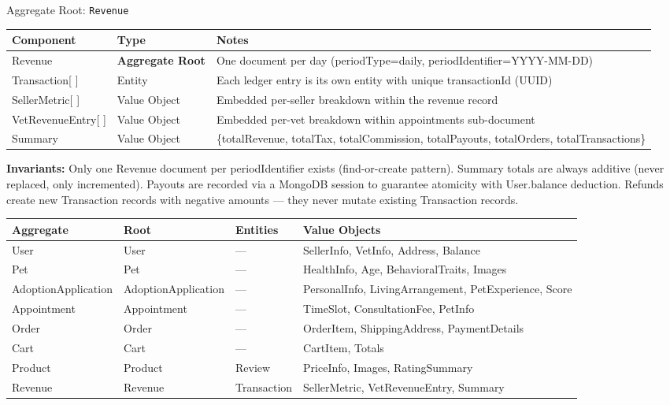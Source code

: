 \documentclass[12pt,a4paper]{article}
\begin{document}
\begin{infobox}{Aggregate Root: \texttt{Revenue}}
\begin{tabular}{@{}p{3cm}p{2.8cm}p{7.8cm}@{}}
\textbf{Component} & \textbf{Type} & \textbf{Notes} \\
\hline
Revenue & \textbf{Aggregate Root} & One document per day (periodType=daily, periodIdentifier=YYYY-MM-DD) \\
Transaction[ ] & Entity & Each ledger entry is its own entity with unique transactionId (UUID) \\
SellerMetric[ ] & Value Object & Embedded per-seller breakdown within the revenue record \\
VetRevenueEntry[ ] & Value Object & Embedded per-vet breakdown within appointments sub-document \\
Summary & Value Object & \{totalRevenue, totalTax, totalCommission, totalPayouts, totalOrders, totalTransactions\} \\
\end{tabular}

\textbf{Invariants:} Only one Revenue document per periodIdentifier exists (find-or-create pattern). Summary totals are always additive (never replaced, only incremented). Payouts are recorded via a MongoDB session to guarantee atomicity with User.balance deduction. Refunds create new Transaction records with negative amounts — they never mutate existing Transaction records.
\end{infobox}

\vspace{1em}

\begin{tcolorbox}[enhanced, colback=ctxBlue!20!white, colframe=primary,
  arc=4pt, boxrule=0.8pt, title={\textbf{Aggregate Design Summary}}]
\begin{tabular}{@{}p{3.5cm}p{3cm}p{2.2cm}p{4.8cm}@{}}
\toprule
\textbf{Aggregate} & \textbf{Root} & \textbf{Entities} & \textbf{Value Objects} \\
\midrule
User & User & — & SellerInfo, VetInfo, Address, Balance \\
Pet & Pet & — & HealthInfo, Age, BehavioralTraits, Images \\
AdoptionApplication & AdoptionApplication & — & PersonalInfo, LivingArrangement, PetExperience, Score \\
Appointment & Appointment & — & TimeSlot, ConsultationFee, PetInfo \\
Order & Order & — & OrderItem, ShippingAddress, PaymentDetails \\
Cart & Cart & — & CartItem, Totals \\
Product & Product & Review & PriceInfo, Images, RatingSummary \\
Revenue & Revenue & Transaction & SellerMetric, VetRevenueEntry, Summary \\
\bottomrule
\end{tabular}
\end{tcolorbox}
\end{document}
